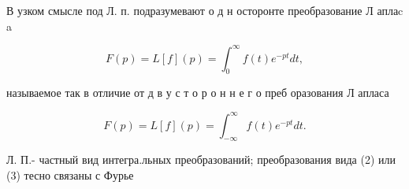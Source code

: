 \documentclass[10pt]{article}
\begin{document}
В узком смысле под Л. п. подразумевают о д н осторонте преобразование Л аплаc a



\[

F(p)=L[f](p)=\int_{0}^{\infty} f(t) e^{-p t} d t,

\]



называемое так в отличие от д в у с т о р о н н е г о преб оразования Л апласа



\[

F(p)=L[f](p)=\int_{-\infty}^{\infty} f(t) e^{-p t} d t .

\]



Л. П.- частный вид интегра.льных преобразований; преобразования вида (2) или (3) тесно связаны с Фурье
\end{document}
